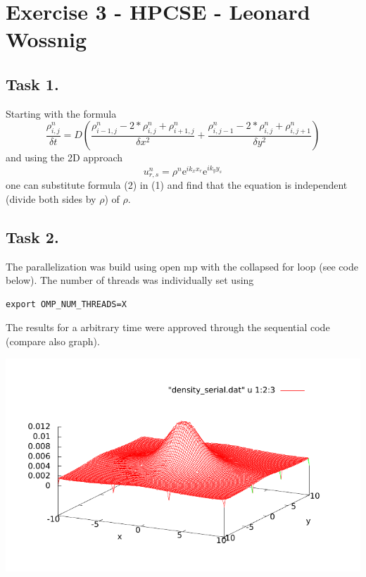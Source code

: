 \documentclass[12pt]{scrbook}
\begin{document}
\section{Exercise 3 - HPCSE - Leonard Wossnig}
\subsection{Task 1.}
Starting with the formula
\begin{equation}
\frac{\rho_{i,j}^n}{\delta t} = D \left( \frac{\rho_{i-1,j}^n- 2 * \rho_{i,j}^n + \rho_{i+1,j}^n }{\delta x^2} + \frac{\rho_{i,j-1}^n- 2 * \rho_{i,j}^n + \rho_{i,j+1}^n }{\delta y^2} \right)
\end{equation}
and using the 2D approach 
\begin{equation}
u_{r,s}^n = \rho ^n \text{e}^{ik_xx_r} \text{e}^{ik_yy_s}
\end{equation}
one can substitute formula (2) in (1) and find that the equation is independent (divide both sides by $\rho$) of $\rho$. 
\subsection{Task 2.}

The parallelization was build using open mp with the collapsed for loop (see code below). The number of threads was individually set using 
\begin{lstlisting}[language=CodeBlocks] 
export OMP_NUM_THREADS=X 
\end{lstlisting}
The results for a arbitrary time were approved through the sequential code (compare also graph).\\
\begin{center}
\includegraphics[width=\textwidth, keepaspectratio]{diffusion.pdf}
\end{center}
\end{document}
